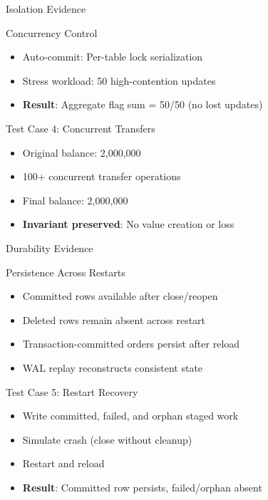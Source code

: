 \documentclass[aspectratio=169]{beamer}
\begin{document}
\begin{frame}{Isolation Evidence}
\begin{block}{Concurrency Control}
\begin{itemize}
  \item Auto-commit: Per-table lock serialization
  \item Stress workload: 50 high-contention updates
  \item \textbf{Result}: Aggregate flag sum = 50/50 (no lost updates)
\end{itemize}
\end{block}

\begin{exampleblock}{Test Case 4: Concurrent Transfers}
\begin{itemize}
  \item Original balance: 2,000,000
  \item 100+ concurrent transfer operations
  \item Final balance: 2,000,000
  \item \textbf{Invariant preserved}: No value creation or loss
\end{itemize}
\end{exampleblock}
\end{frame}

\begin{frame}{Durability Evidence}
\begin{block}{Persistence Across Restarts}
\begin{itemize}
  \item Committed rows available after close/reopen
  \item Deleted rows remain absent across restart
  \item Transaction-committed orders persist after reload
  \item WAL replay reconstructs consistent state
\end{itemize}
\end{block}

\begin{exampleblock}{Test Case 5: Restart Recovery}
\begin{itemize}
  \item Write committed, failed, and orphan staged work
  \item Simulate crash (close without cleanup)
  \item Restart and reload
  \item \textbf{Result}: Committed row persists, failed/orphan absent
\end{itemize}
\end{exampleblock}
\end{frame}
\end{document}
